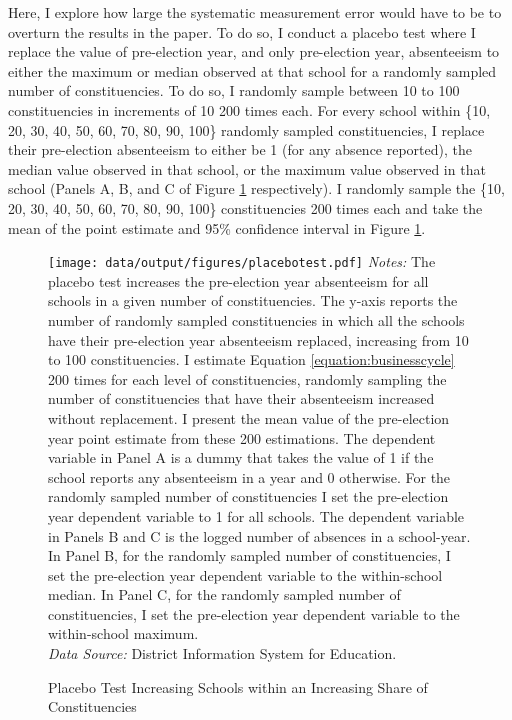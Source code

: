 \documentclass[hidelinks, 12pt, article, oneside]{memoir}
\begin{document}
Here, I explore how large the systematic measurement error would have to be to overturn the results in the paper. To do so, I conduct a placebo test where I replace the value of pre-election year, and only pre-election year, absenteeism to either the maximum or median observed at that school for a randomly sampled number of constituencies. To do so, I randomly sample between 10 to 100 constituencies in increments of 10 200 times each.  For every school within \{10, 20, 30, 40, 50, 60, 70, 80, 90, 100\} randomly sampled constituencies, I replace their pre-election absenteeism to either be 1 (for any absence reported), the median value observed in that school, or the maximum value observed in that school (Panels A, B, and C of Figure \ref{fig:placebotest} respectively). I randomly sample the \{10, 20, 30, 40, 50, 60, 70, 80, 90, 100\} constituencies 200 times each and take the mean of the point estimate and 95\% confidence interval in Figure \ref{fig:placebotest}.

\begin{figure}[htbp]
\caption{Placebo Test Increasing Schools within an Increasing Share of Constituencies\label{fig:placebotest}}
\centering
\begin{minipage}{6.5in}
    \texttt{[image: data/output/figures/placebotest.pdf]}
    \tiny \emph{Notes:} The placebo test increases the pre-election year absenteeism for all schools in a given number of constituencies. The y-axis reports the number of randomly sampled constituencies in which all the schools have their pre-election year absenteeism replaced, increasing from 10 to 100 constituencies. I estimate Equation \ref{equation:businesscycle} 200 times for each level of constituencies, randomly sampling the number of constituencies that have their absenteeism increased without replacement. I present the mean value of the pre-election year point estimate from these 200 estimations. The dependent variable in Panel A is a dummy that takes the value of 1 if the school reports any absenteeism in a year and 0 otherwise. For the randomly sampled number of constituencies I set the pre-election year dependent variable to 1 for all schools. The dependent variable in Panels B and C is the logged number of absences in a school-year. In Panel B, for the randomly sampled number of constituencies, I set the pre-election year dependent variable to the within-school median. In Panel C, for the randomly sampled number of constituencies, I set the pre-election year dependent variable to the within-school maximum.\\
    \emph{Data Source:} District Information System for Education.
\end{minipage}
\end{figure}
\end{document}
